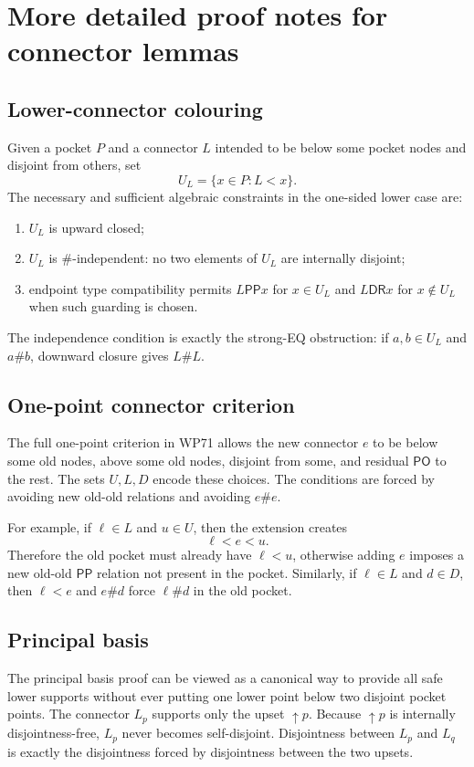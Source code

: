 \documentclass[11pt]{article}
\newcommand{\PP}{\mathsf{PP}}
\newcommand{\PO}{\mathsf{PO}}
\newcommand{\DR}{\mathsf{DR}}
\begin{document}
\section{More detailed proof notes for connector lemmas}

\subsection{Lower-connector colouring}

Given a pocket $P$ and a connector $L$ intended to be below some pocket nodes and disjoint from others, set
\[
U_L=\{x\in P:L<x\}.
\]
The necessary and sufficient algebraic constraints in the one-sided lower case are:
\begin{enumerate}[label=(\roman*)]
\item $U_L$ is upward closed;
\item $U_L$ is $\#$-independent: no two elements of $U_L$ are internally disjoint;
\item endpoint type compatibility permits $L\PP x$ for $x\in U_L$ and $L\DR x$ for $x\notin U_L$ when such guarding is chosen.
\end{enumerate}
The independence condition is exactly the strong-EQ obstruction: if $a,b\in U_L$ and $a\#b$, downward closure gives $L\#L$.

\subsection{One-point connector criterion}

The full one-point criterion in WP71 allows the new connector $e$ to be below some old nodes, above some old nodes, disjoint from some, and residual $\PO$ to the rest. The sets $U,L,D$ encode these choices. The conditions are forced by avoiding new old-old relations and avoiding $e\#e$.

For example, if $\ell\in L$ and $u\in U$, then the extension creates
\[
\ell<e<u.
\]
Therefore the old pocket must already have $\ell<u$, otherwise adding $e$ imposes a new old-old $\PP$ relation not present in the pocket. Similarly, if $\ell\in L$ and $d\in D$, then $\ell<e$ and $e\#d$ force $\ell\#d$ in the old pocket.

\subsection{Principal basis}

The principal basis proof can be viewed as a canonical way to provide all safe lower supports without ever putting one lower point below two disjoint pocket points. The connector $L_p$ supports only the upset $\uparrow p$. Because $\uparrow p$ is internally disjointness-free, $L_p$ never becomes self-disjoint. Disjointness between $L_p$ and $L_q$ is exactly the disjointness forced by disjointness between the two upsets.
\end{document}
